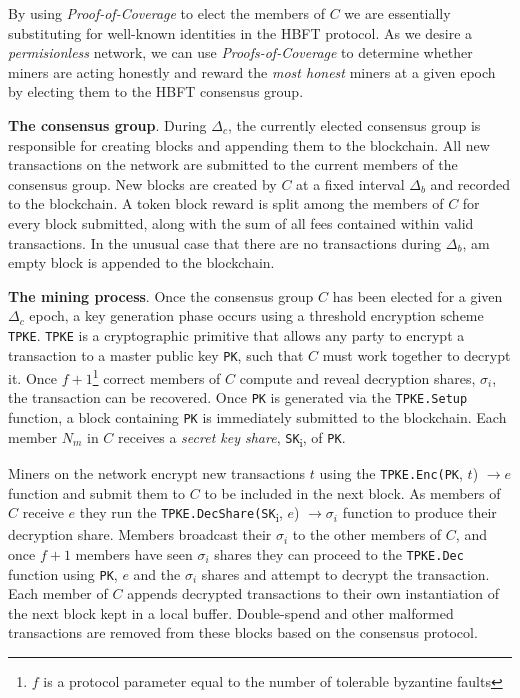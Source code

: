 \documentclass[10pt, nonatbib, nocopyrightspace, reprint]{sigplanconf}
\begin{document}
By using \emph{Proof-of-Coverage} to elect the members of $C$ we are essentially substituting for well-known identities in the HBFT protocol. As we desire a \emph{permisionless} network, we can use \emph{Proofs-of-Coverage} to determine whether miners are acting honestly and reward the \emph{most honest} miners at a given epoch by electing them to the HBFT consensus group.

\textbf{The consensus group}. During $\Delta_c$, the currently elected consensus group is responsible for creating blocks and appending them to the blockchain. All new transactions on the network are submitted to the current members of the consensus group. New blocks are created by $C$ at a fixed interval $\Delta_b$ and recorded to the blockchain. A token block reward is split among the members of $C$ for every block submitted, along with the sum of all fees contained within valid transactions. In the unusual case that there are no transactions during $\Delta_b$, am empty block is appended to the blockchain.

\textbf{The mining process}. Once the consensus group $C$ has been elected for a given $\Delta_c$ epoch, a key generation phase occurs using a threshold encryption scheme \verb|TPKE|. \verb|TPKE| is a cryptographic primitive that allows any party to encrypt a transaction to a master public key \verb|PK|, such that $C$ must work together to decrypt it. Once $f + 1$\footnote{$f$ is a protocol parameter equal to the number of tolerable byzantine faults} correct members of $C$ compute and reveal decryption shares, $\sigma_i$, the transaction can be recovered. Once \verb|PK| is generated via the \verb|TPKE.Setup| function, a block containing \verb|PK| is immediately submitted to the blockchain. Each member $N_m$ in $C$ receives a \emph{secret key share}, \verb|SK|\textsubscript{i}, of \verb|PK|.

Miners on the network encrypt new transactions $t$ using the \verb|TPKE.Enc(PK|, $t$) $\rightarrow e$ function and submit them to $C$ to be included in the next block. As members of $C$ receive $e$ they run the \verb|TPKE.DecShare(SK|\textsubscript{i}, $e$) $\rightarrow \sigma_i$ function to produce their decryption share. Members broadcast their $\sigma_i$ to the other members of $C$, and once $f + 1$ members have seen $\sigma_i$ shares they can proceed to the \verb|TPKE.Dec| function using \verb|PK|, $e$ and the $\sigma_i$ shares and attempt to decrypt the transaction. Each member of $C$ appends decrypted transactions to their own instantiation of the next block kept in a local buffer. Double-spend and other malformed transactions are removed from these blocks based on the consensus protocol.
\end{document}
